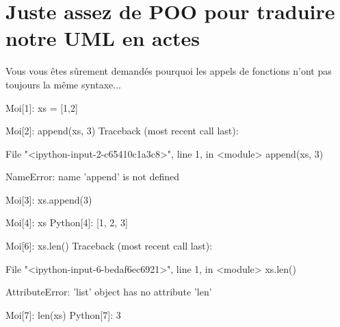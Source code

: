 \documentclass[french]{beamer}
\begin{document}
\section{Juste assez de POO pour traduire notre UML en actes}


\begin{frame}
  
Vous  vous   êtes  sûrement  demandés   pourquoi  les  appels   de  \og
fonctions\fg{} n'ont pas toujours la même syntaxe...

\end{frame}



\begin{frame}[fragile]
\begin{pythoncode}
Moi[1]: xs = [1,2]

Moi[2]: append(xs, 3)
Traceback (most recent call last):

  File "<ipython-input-2-c65410c1a3c8>", line 1, in <module>
    append(xs, 3)

NameError: name 'append' is not defined
\end{pythoncode}
\end{frame}


\begin{frame}[fragile]
  \begin{pythoncode}
Moi[3]: xs.append(3)

Moi[4]: xs
Python[4]: [1, 2, 3]
\end{pythoncode}
\end{frame}





\begin{frame}[fragile]
  \begin{pythoncode}

Moi[6]: xs.len()
Traceback (most recent call last):

  File "<ipython-input-6-bedaf6ec6921>", line 1, in <module>
    xs.len()

AttributeError: 'list' object has no attribute 'len'
\end{pythoncode}
\end{frame}


\begin{frame}[fragile]
\begin{pythoncode}
Moi[7]: len(xs)
Python[7]: 3
\end{pythoncode}
  
\end{frame}
\end{document}
